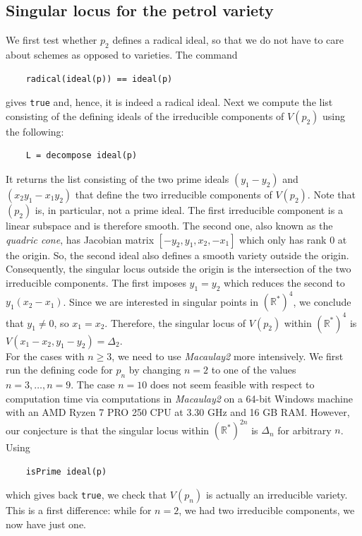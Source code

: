 \documentclass[11pt]{amsart}
\numberwithin{equation}{section}
\theoremstyle{plain}
\theoremstyle{definition}
\newcommand{\R}{\mathbb{R}}
\begin{document}
\subsection{Singular locus for the petrol variety}\label{sec:singular-locus}
We first test whether $p_2$ defines a radical ideal, so that we do not have to care about schemes as opposed to varieties. The command
\begin{verbatim}
    radical(ideal(p)) == ideal(p)
\end{verbatim}
gives \texttt{true} and, hence, it is indeed a radical ideal. Next we compute the list consisting of the defining ideals of the irreducible components of $V(p_2)$ using the following:
\begin{verbatim}
    L = decompose ideal(p)
\end{verbatim}
It returns the list consisting of the two prime ideals $\left(y_{1}-y_{2}\right)$ and $\left(x_{2}y_{1}-x_{1}y_{2}\right)$ that define the two irreducible components of $V(p_2)$. Note that $(p_2)$ is, in particular, not a prime ideal. The first irreducible component is a linear subspace and is therefore smooth. The second one, also known as the \emph{quadric cone}, has Jacobian matrix $[-y_2,y_1,x_2,-x_1]$ which only has rank $0$ at the origin. So, the second ideal also defines a smooth variety outside the origin. Consequently, the singular locus outside the origin is the intersection of the two irreducible components. The first imposes $y_1 = y_2$ which reduces the second to $y_1(x_2 - x_1)$. Since we are interested in singular points in $(\R^*)^4$, we conclude that $y_1 \neq 0$, so $x_1 = x_2$. Therefore, the singular locus of $V(p_2)$ within $(\R^*)^4$ is $V(x_1 - x_2, y_1 - y_2) = \Delta_2$.\\


 For the cases with $n \geq 3$, we need to use \emph{Macaulay2} more intensively. We first run the defining code for $p_n$ by changing $n = 2$ to one of the values $n = 3, \ldots,n = 9$. The case $n = 10$ does not seem feasible with respect to computation time via computations in \emph{Macaulay2} on a 64-bit Windows machine with an AMD Ryzen 7 PRO 250 CPU
at 3.30 GHz and 16 GB RAM. However, our conjecture is that the singular locus within $(\R^*)^{2n}$ is $\Delta_n$ for arbitrary $n$. Using
\begin{verbatim}
    isPrime ideal(p)
\end{verbatim}
which gives back \texttt{true}, we check that $V(p_n)$ is actually an irreducible variety. This is a first difference: while for $n = 2$, we had two irreducible components, we now have just one. 
\end{document}

